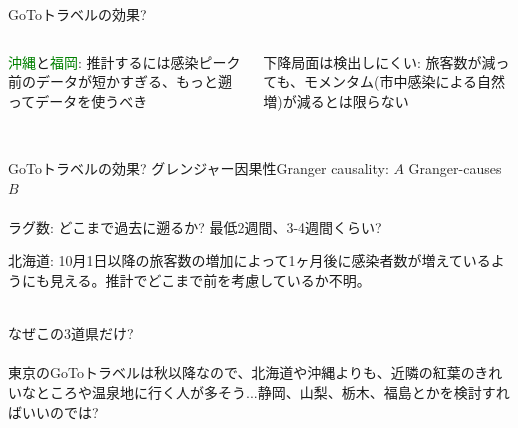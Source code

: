\begin{frame}[t]{GoToトラベルの効果?}
\begin{columns}[T]
\pause
{}
\begin{dinglist}{43}
\vspace{1.0ex}\setlength{\itemsep}{1.0ex}\setlength{\baselineskip}{12pt}
\pause
\item	\textcolor{green}{沖縄}と\textcolor{green}{福岡}: 推計するには感染ピーク前のデータが短かすぎる、もっと遡ってデータを使うべき\\~\\
\end{dinglist}
\pause
下降局面は検出しにくい: 旅客数が減っても、モメンタム(市中感染による自然増)が減るとは限らない\\~\\
\end{columns}
\end{frame}


\begin{frame}[t]{GoToトラベルの効果?}
グレンジャー因果性Granger causality: $A$ Granger-causes $B$\\~\\
\pause
ラグ数: どこまで過去に遡るか? 最低2週間、3-4週間くらい?
\begin{dinglist}{43}
\vspace{1.0ex}\setlength{\itemsep}{1.0ex}\setlength{\baselineskip}{12pt}
\item	北海道: 10月1日以降の旅客数の増加によって1ヶ月後に感染者数が増えているようにも見える。推計でどこまで前を考慮しているか不明。\\~\\
\end{dinglist}
\pause
なぜこの3道県だけ?\\~\\
\pause
東京のGoToトラベルは秋以降なので、北海道や沖縄よりも、近隣の紅葉のきれいなところや温泉地に行く人が多そう...静岡、山梨、栃木、福島とかを検討すればいいのでは?
\end{frame}




